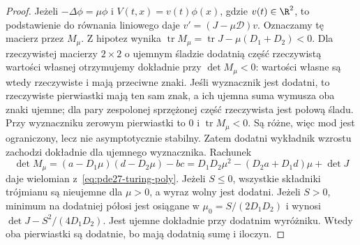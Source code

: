 \begin{proof}
Jeżeli $-\Delta\phi=\mu\phi$ i
$V(t,x)=v(t)\phi(x)$, gdzie $v(t)\in\R^2$,
to podstawienie do równania liniowego daje
$v'=(J-\mu\mathcal D)v$. Oznaczamy tę macierz
przez $M_\mu$.
Z hipotez wynika
$\operatorname{tr}M_\mu=\operatorname{tr}J-
\mu(D_1+D_2)<0$. Dla rzeczywistej macierzy $2\times2$
o ujemnym śladzie dodatnią część rzeczywistą
wartości własnej otrzymujemy dokładnie przy
$\det M_\mu<0$: wartości własne są wtedy
rzeczywiste i mają przeciwne znaki.
Jeśli wyznacznik jest dodatni, to rzeczywiste
pierwiastki mają ten sam znak, a ich ujemna suma
wymusza oba znaki ujemne; dla pary zespolonej
sprzężonej część rzeczywista jest połową śladu.
Przy wyznaczniku zerowym pierwiastki to $0$
i $\operatorname{tr}M_\mu<0$. Są różne, więc
mod jest ograniczony, lecz nie asymptotycznie stabilny.
Zatem dodatni wykładnik wzrostu zachodzi dokładnie
dla ujemnego wyznacznika. Rachunek
\[
 \det M_\mu=(a-D_1\mu)(d-D_2\mu)-bc
 =D_1D_2\mu^2-(D_2a+D_1d)\mu+\det J
\]
daje wielomian z~\eqref{eq:pde27-turing-poly}.
Jeżeli $S\le0$, wszystkie składniki trójmianu
są nieujemne dla $\mu>0$, a wyraz wolny jest dodatni.
Jeżeli $S>0$, minimum na dodatniej półosi
jest osiągane w $\mu_0=S/(2D_1D_2)$ i wynosi
$\det J-S^2/(4D_1D_2)$. Jest ujemne dokładnie
przy dodatnim wyróżniku. Wtedy oba pierwiastki
są dodatnie, bo mają dodatnią sumę i iloczyn.


\end{proof}
